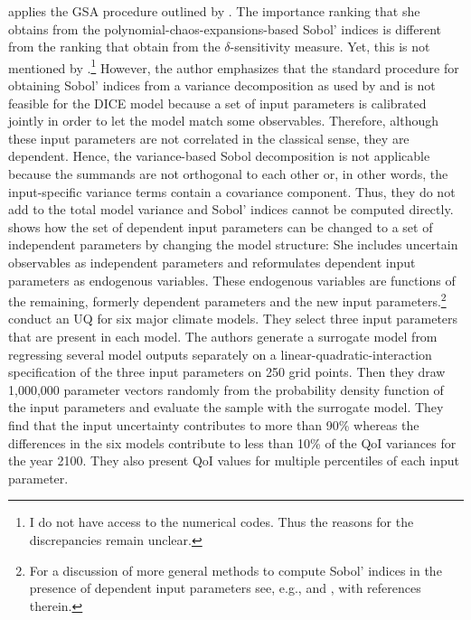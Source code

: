 \cite{Miftakhova.2018} applies the GSA procedure outlined by \cite{Harenberg.2019}. The importance ranking that she obtains from the polynomial-chaos-expansions-based Sobol' indices is different from the ranking that \cite{Anderson.2014} obtain from the $\delta$-sensitivity measure. Yet, this is not mentioned by \citeauthor{Miftakhova.2018}.\footnote{I do not have access to the numerical codes. Thus the reasons for the discrepancies remain unclear.} However, the author emphasizes that the standard procedure for obtaining Sobol' indices from a variance decomposition as used by \cite{Anderson.2014} and \cite{Butler.2014} is not feasible for the DICE model because a set of input parameters is calibrated jointly in order to let the model match some observables. Therefore, although these input parameters are not correlated in the classical sense, they are dependent. Hence, the variance-based Sobol decomposition is not applicable because the summands are not orthogonal to each other or, in other words, the input-specific variance terms contain a covariance component. Thus, they do not add to the total model variance and Sobol' indices cannot be computed directly. \cite{Miftakhova.2018} shows how the set of dependent input parameters can be changed to a set of independent parameters by changing the model structure: She includes uncertain observables as independent parameters and reformulates dependent input parameters as endogenous variables. These endogenous variables are functions of the remaining, formerly dependent parameters and the new input parameters.\footnote{For a discussion of more general methods to compute Sobol' indices in the presence of dependent input parameters see, e.g., \cite{Chastaing.2015} and \cite{Wiederkehr.2018}, with references therein.}\\
\newline
\cite{Gillingham.2015} conduct an UQ for six major climate models. They select three input parameters that are present in each model. The authors generate a surrogate model from regressing several model outputs separately on a linear-quadratic-interaction specification of the three input parameters on 250 grid points. Then they draw 1,000,000 parameter vectors randomly from the probability density function of the input parameters and evaluate the sample with the surrogate model. They find that the input uncertainty contributes to more than 90\% whereas the differences in the six models contribute to less than 10\% of the QoI variances for the year 2100. They also present QoI values for multiple percentiles of each input parameter.\\
